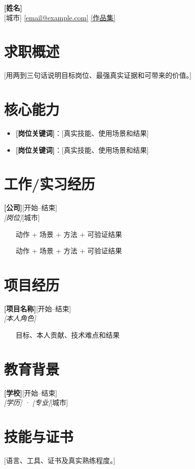 \documentclass[10pt,a4paper]{ctexart}
\newcommand{\entry}[4]{\noindent\textbf{#1}\hfill #2\\\textit{#3}\hfill #4\par}
\begin{document}
\begin{center}
  {\LARGE\bfseries [姓名]}\\[3pt]
  [城市] \quad [手机号] \quad \href{mailto:[email@example.com]}{[email@example.com]} \quad \href{[作品集URL]}{[作品集]}
\end{center}

\section{求职概述}
[用两到三句话说明目标岗位、最强真实证据和可带来的价值。]

\section{核心能力}
\begin{itemize}
  \item \textbf{[岗位关键词]}：[真实技能、使用场景和结果]
  \item \textbf{[岗位关键词]}：[真实技能、使用场景和结果]
\end{itemize}

\section{工作/实习经历}
\entry{[公司]}{[开始--结束]}{[岗位]}{[城市]}
\begin{itemize}
  \item [动作 + 场景 + 方法 + 可验证结果]
  \item [动作 + 场景 + 方法 + 可验证结果]
\end{itemize}

\section{项目经历}
\entry{[项目名称]}{[开始--结束]}{[本人角色]}{}
\begin{itemize}
  \item [目标、本人贡献、技术难点和结果]
\end{itemize}

\section{教育背景}
\entry{[学校]}{[开始--结束]}{[学历] · [专业]}{[城市]}
[仍在读时明确写“预计 YYYY 年 MM 月毕业”。]

\section{技能与证书}
[语言、工具、证书及真实熟练程度。]
\end{document}
